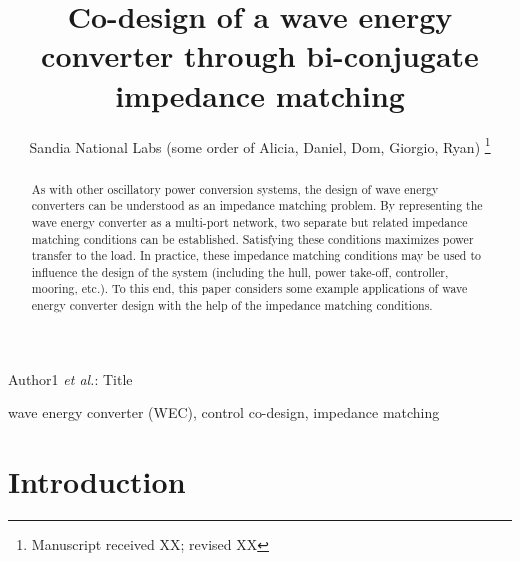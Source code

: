 \documentclass[lettersize,journal]{IEEEtran}
\begin{document}
\title{Co-design of a wave energy converter through bi-conjugate impedance matching }
{}
\author{Sandia National Labs (some order of Alicia, Daniel, Dom, Giorgio, Ryan)
\thanks{Manuscript received XX; revised XX}}

%
{Author1 \MakeLowercase{\textit{et al.}}: Title}


\maketitle

\begin{abstract}
As with other oscillatory power conversion systems, the design of wave energy converters can be understood as an impedance matching problem. 
By representing the wave energy converter as a multi-port network, two separate but related impedance matching conditions can be established. 
Satisfying these conditions maximizes power transfer to the load. 
In practice, these impedance matching conditions may be used to influence the design of the system (including the hull, power take-off, controller, mooring, etc.). 
To this end, this paper considers some example applications of wave energy converter design with the help of the impedance matching conditions.
\end{abstract}

\begin{IEEEkeywords}
wave energy converter (WEC), control co-design, impedance matching
\end{IEEEkeywords}

\section{Introduction}
\end{document}
